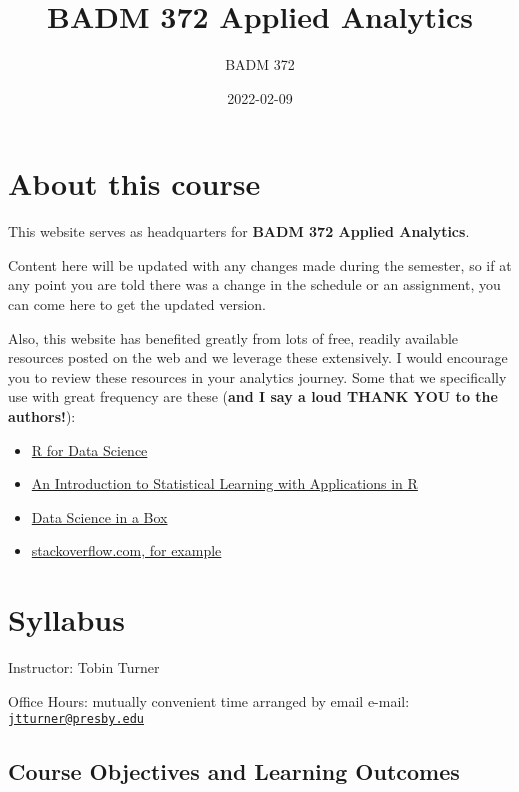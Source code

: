 \documentclass[
]{book}
\title{BADM 372 Applied Analytics}
\author{BADM 372}
\date{2022-02-09}
\providecommand{\tightlist}{%
  \setlength{\itemsep}{0pt}\setlength{\parskip}{0pt}}
\begin{document}
\maketitle

{
\setcounter{tocdepth}{1}
\tableofcontents
}
\hypertarget{about-this-course}{%
\chapter{About this course}\label{about-this-course}}

This website serves as headquarters for \textbf{BADM 372 Applied Analytics}.

Content here will be updated with any changes made during the semester, so if at any point you are told there was a change in the schedule or an assignment, you can come here to get the updated version.

Also, this website has benefited greatly from lots of free, readily available resources posted on the web and we leverage these extensively. I would encourage you to review these resources in your analytics journey. Some that we specifically use with great frequency are these (\textbf{and I say a loud THANK YOU to the authors!}):

\begin{itemize}
\tightlist
\item
  \href{https://r4ds.had.co.nz/}{R for Data Science}
\item
  \href{https://trevorhastie.github.io/ISLR/}{An Introduction to Statistical Learning with Applications in R}
\item
  \href{https://datasciencebox.org/}{Data Science in a Box}
\item
  \href{https://stackoverflow.com/questions/4862178/remove-rows-with-all-or-some-nas-missing-values-in-data-frame?rq=1}{stackoverflow.com, for example}
\end{itemize}

\hypertarget{syllabus}{%
\chapter{Syllabus}\label{syllabus}}

Instructor: Tobin Turner

Office Hours: mutually convenient time arranged by email e-mail: \href{mailto:jtturner@presby.edu}{\nolinkurl{jtturner@presby.edu}}

\hypertarget{course-objectives-and-learning-outcomes}{%
\section{Course Objectives and Learning Outcomes}\label{course-objectives-and-learning-outcomes}}
\end{document}
